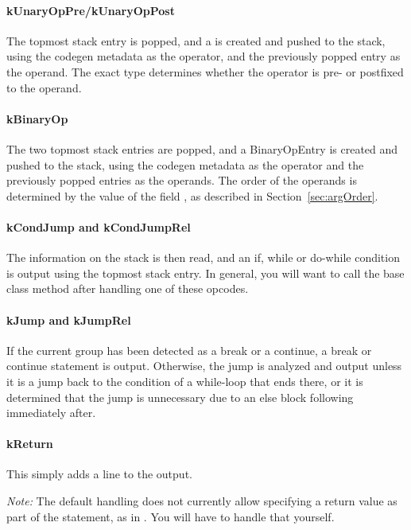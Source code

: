 \paragraph{kUnaryOpPre/kUnaryOpPost}
The topmost stack entry is popped, and a  is created and pushed to the stack, using the codegen metadata as the operator, and the previously popped entry as the operand. The exact type determines whether the operator is pre- or postfixed to the operand.

\paragraph{kBinaryOp}
The two topmost stack entries are popped, and a BinaryOpEntry is created and pushed to the stack, using the codegen metadata as the operator and the previously popped entries as the operands. The order of the operands is determined by the value of the field , as described in Section~\vref{sec:argOrder}.

\paragraph{kCondJump and kCondJumpRel}
The information on the stack is then read, and an if, while or do-while condition is output using the topmost stack entry. In general, you will want to call the base class method after handling one of these opcodes.

\paragraph{kJump and kJumpRel}
If the current group has been detected as a break or a continue, a break or continue statement is output. Otherwise, the jump is analyzed and output unless it is a jump back to the condition of a while-loop that ends there, or it is determined that the jump is unnecessary due to an else block following immediately after.

\paragraph{kReturn}
This simply adds a line  to the output.

\emph{Note:} The default handling does not currently allow specifying a return value as part of the statement, as in . You will have to handle that yourself.

